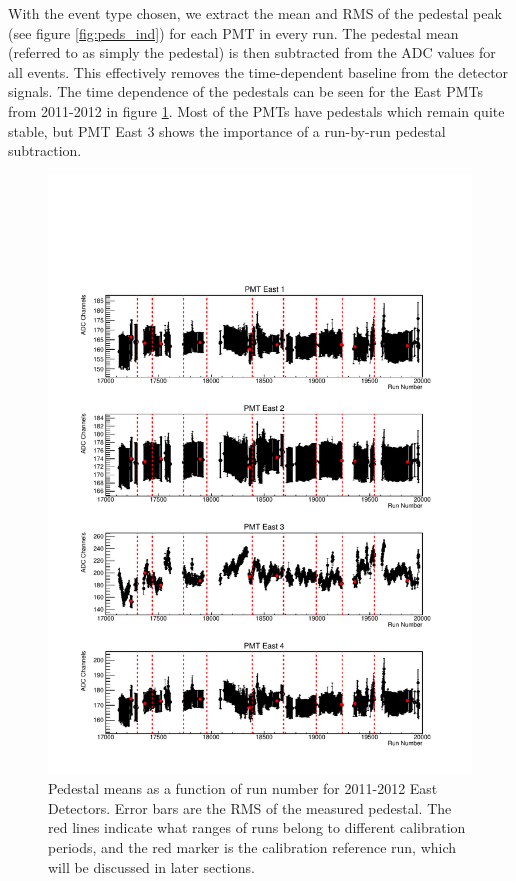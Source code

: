 With the event type chosen, we extract the mean and RMS of the pedestal peak (see figure
\ref{fig:peds_ind}) for each PMT in every run. The pedestal mean (referred to as simply
the pedestal) is then subtracted from the ADC values for all events. This effectively
removes the time-dependent baseline from the detector signals. The time dependence of
the pedestals can be seen for the East PMTs from 2011-2012 in figure \ref{fig:peds_timeDep}.
Most of the PMTs have pedestals which remain quite stable, but PMT East 3 shows the
importance of a run-by-run pedestal subtraction.

\begin{figure}[p]
\centering
\includegraphics[page=1,scale=0.8]{3-UCNAAnalysis/2011-2012_pedestals.pdf}
\caption{Pedestal means as a function of run number for 2011-2012 East Detectors. Error bars are the
  RMS of the measured pedestal. The red lines indicate what ranges of runs belong to
  different calibration periods, and the red marker is the calibration reference run,
  which will be discussed in later sections.}
 \label{fig:peds_timeDep}
\end{figure}

